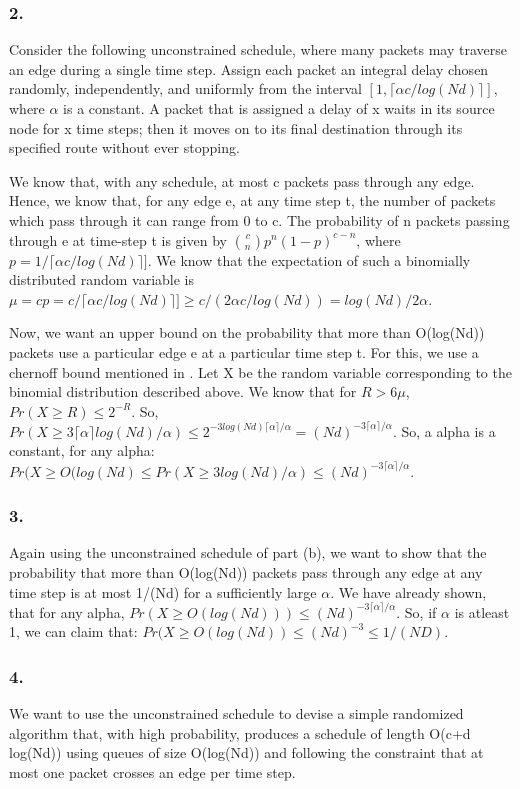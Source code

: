 \documentclass[10pt]{article}
\begin{document}
\subsubsection{2.}
Consider the following unconstrained schedule, where many packets may traverse an edge during a single time step. Assign each packet an integral delay chosen randomly, independently, and uniformly from the interval $[1, \lceil \alpha c/log(Nd)\rceil]$, where $\alpha$ is a constant. A packet that is assigned a delay of x waits in its source node for x time steps; then it moves on to its final destination through its specified route without ever stopping.

We know that, with any schedule, at most c packets pass through any edge. Hence, we know that, for any edge e, at any time step t, the number of packets which pass through it can range from 0 to c. The probability of n packets passing through e at time-step t is given by $\binom{c}{n}p^{n}(1-p)^{c-n}$, where $p=1/\lceil \alpha c/log(Nd)\rceil]$. We know that the expectation of such a binomially distributed random variable is $\mu = cp = c /\lceil \alpha c/log(Nd)\rceil] \geq c /(2\alpha c/log(Nd))=log(Nd)/2\alpha$.

Now, we want an upper bound on the probability that more than O(log(Nd)) packets use a particular edge e at a particular time step t. For this, we use a chernoff bound mentioned in \cite{mitzenmacherUpfal}. Let X be the random variable corresponding to the binomial distribution described above. We know that for $R>6\mu$, $Pr(X \geq R)\leq 2^{-R}$. So, $Pr(X \geq 3\lceil\alpha\rceil log(Nd)/\alpha) \leq 2^{-3log(Nd)\lceil\alpha\rceil/\alpha} = (Nd)^{-3\lceil\alpha\rceil/\alpha}$. So, a alpha is a constant, for any alpha: $Pr(X \geq O(log(Nd) \leq Pr(X \geq 3log(Nd)/\alpha) \leq (Nd)^{-3\lceil\alpha\rceil/\alpha}$.

\subsubsection{3.}
Again using the unconstrained schedule of part (b), we want to show that the probability that more than O(log(Nd)) packets pass through any edge at any time step is at most 1/(Nd) for a sufficiently large $\alpha$. We have already shown, that for any alpha, $Pr(X \geq O(log(Nd))) \leq (Nd)^{-3\lceil\alpha\rceil/\alpha}$. So, if $\alpha$ is atleast 1, we can claim that: $Pr(X \geq O(log(Nd)) \leq (Nd)^{-3} \leq 1/(ND)$.

\subsubsection{4.}
We want to use the unconstrained schedule to devise a simple randomized algorithm that, with high probability, produces a schedule of length O(c+d log(Nd)) using queues of size O(log(Nd)) and following the constraint that at most one packet crosses an edge per time step.
\end{document}
